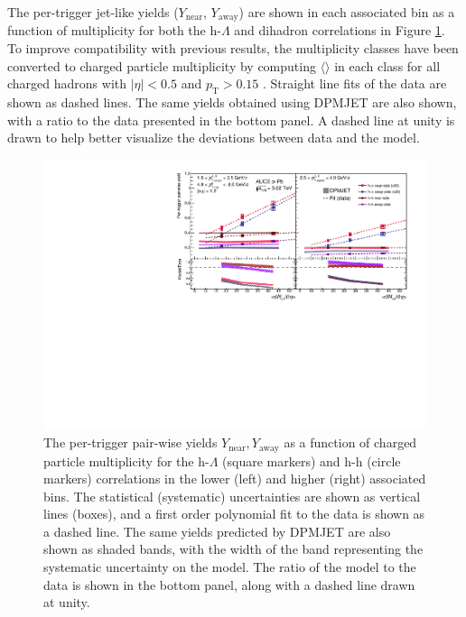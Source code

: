The per-trigger jet-like yields ($Y_{\text{near}}$, $Y_{\text{away}}$) are shown in each associated \pt bin as a function of multiplicity for both the h-$\Lambda$ and dihadron correlations in Figure \ref{fig:pairwise_yield}. To improve compatibility with previous results, the multiplicity classes have been converted to charged particle multiplicity by computing $\langle$\dndeta$\rangle$ in each class for all charged hadrons with $|\eta| < 0.5$ and $p_{\text{T}} > 0.15$ \GeVc. Straight line fits of the data are shown as dashed lines. The same yields obtained using DPMJET are also shown, with a ratio to the data presented in the bottom panel. A dashed line at unity is drawn to help better visualize the deviations between data and the model.

\begin{figure}[h!]
\centering
\includegraphics[width=\textwidth]{figures/results/final_pairwise_plot_new_x_axis_model_ratio.pdf}
\caption{The per-trigger pair-wise yields $Y_{\text{near}}, Y_{\text{away}}$ as a function of charged particle multiplicity for the h-$\Lambda$ (square markers) and h-h (circle markers) correlations in the lower (left) and higher (right) associated \pt bins. The statistical (systematic) uncertainties are shown as vertical lines (boxes), and a first order polynomial fit to the data is shown as a dashed line. The same yields predicted by DPMJET are also shown as shaded bands, with the width of the band representing the systematic uncertainty on the model. The ratio of the model to the data is shown in the bottom panel, along with a dashed line drawn at unity.}
\label{fig:pairwise_yield}
\end{figure}

